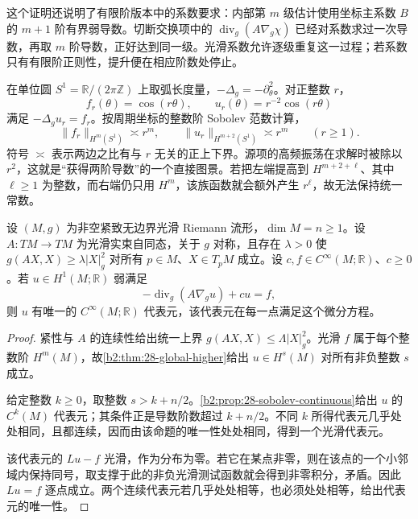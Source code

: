 这个证明还说明了有限阶版本中的系数要求：内部第 \(m\) 级估计使用坐标主系数 \(B\) 的 \(m+1\) 阶有界弱导数。切断交换项中的 \(\operatorname{div}_g(A\nabla_g\chi)\) 已经对系数求过一次导数，再取 \(m\) 阶导数，正好达到同一级。光滑系数允许逐级重复这一过程；若系数只有有限阶正则性，提升便在相应阶数处停止。

\ProseParagraphBreak

在单位圆 \(S^1=\mathbb R/(2\pi\mathbb Z)\) 上取弧长度量，\(-\Delta_g=-\partial_\theta^2\)。对正整数 \(r\)，
\[
 f_r(\theta)=\cos(r\theta),\qquad
 u_r(\theta)=r^{-2}\cos(r\theta)
\]
满足 \(-\Delta_g u_r=f_r\)。按周期坐标的整数阶 Sobolev 范数计算，
\[
 \|f_r\|_{H^m(S^1)}\asymp r^m,\qquad
 \|u_r\|_{H^{m+2}(S^1)}\asymp r^m
 \qquad(r\geq1).
\]
符号 \(\asymp\) 表示两边之比有与 \(r\) 无关的正上下界。源项的高频振荡在求解时被除以 \(r^2\)，这就是“获得两阶导数”的一个直接图景。若把左端提高到 \(H^{m+2+\ell}\)、其中 \(\ell\geq1\) 为整数，而右端仍只用 \(H^m\)，该族函数就会额外产生 \(r^\ell\)，故无法保持统一常数。

\begin{corollary}[光滑数据的光滑解]\label{b2:cor:28-smooth-elliptic}
设 \((M,g)\) 为非空紧致无边界光滑 Riemann 流形，\(\dim M=n\geq1\)。设 \(A:TM\to TM\) 为光滑实束自同态，关于 \(g\) 对称，且存在 \(\lambda>0\) 使
\(g(AX,X)\geq\lambda|X|_g^2\) 对所有 \(p\in M\)、\(X\in T_pM\) 成立。设 \(c,f\in C^\infty(M;\mathbb R)\)、\(c\geq0\)。若 \(u\in H^1(M;\mathbb R)\) 弱满足
\[
 -\operatorname{div}_g(A\nabla_g u)+cu=f,
\]
则 \(u\) 有唯一的 \(C^\infty(M;\mathbb R)\) 代表元，该代表元在每一点满足这个微分方程。
\end{corollary}
\begin{proof}
紧性与 \(A\) 的连续性给出统一上界 \(g(AX,X)\leq\Lambda|X|_g^2\)。光滑 \(f\) 属于每个整数阶 \(H^m(M)\)，故\cref{b2:thm:28-global-higher}给出 \(u\in H^s(M)\) 对所有非负整数 \(s\) 成立。

给定整数 \(k\geq0\)，取整数 \(s>k+n/2\)。\cref{b2:prop:28-sobolev-continuous}给出 \(u\) 的 \(C^k(M)\) 代表元；其条件正是导数阶数超过 \(k+n/2\)。不同 \(k\) 所得代表元几乎处处相同，且都连续，因而由该命题的唯一性处处相同，得到一个光滑代表元。

该代表元的 \(Lu-f\) 光滑，作为分布为零。若它在某点非零，则在该点的一个小邻域内保持同号，取支撑于此的非负光滑测试函数就会得到非零积分，矛盾。因此 \(Lu=f\) 逐点成立。两个连续代表元若几乎处处相等，也必须处处相等，给出代表元的唯一性。
\end{proof}

\ProseParagraphBreak


